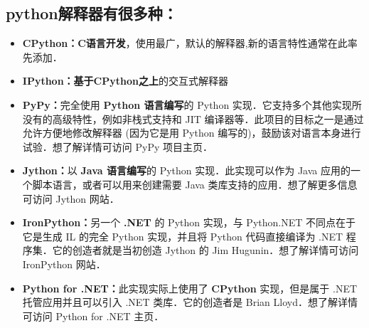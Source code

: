 \subsection{python解释器有很多种：}

\begin{itemize}
\item \textbf{CPython：}\textbf{C语言开发}，使用最广，默认的解释器,新的语言特性通常在此率先添加．

\item \textbf{IPython：}\textbf{基于CPython之上}的交互式解释器

\item \textbf{PyPy：}完全使用 \textbf{Python 语言编写}的 Python 实现．它支持多个其他实现所没有的高级特性，例如非栈式支持和 JIT 编译器等．此项目的目标之一是通过允许方便地修改解释器 (因为它是用 Python 编写的)，鼓励该对语言本身进行试验．想了解详情可访问 PyPy 项目主页．

\item \textbf{Jython：}以 \textbf{Java 语言编写}的 Python 实现．此实现可以作为 Java 应用的一个脚本语言，或者可以用来创建需要 Java 类库支持的应用．想了解更多信息可访问 Jython 网站．

\item \textbf{IronPython：}另一个 \textbf{.NET} 的 Python 实现，与 Python.NET 不同点在于它是生成 IL 的完全 Python 实现，并且将 Python 代码直接编译为 .NET 程序集．它的创造者就是当初创造 Jython 的 Jim Hugunin．想了解详情可访问 IronPython 网站．

\item \textbf{Python for .NET：}此实现实际上使用了 \textbf{CPython} 实现，但是属于 .NET 托管应用并且可以引入 .NET 类库．它的创造者是 Brian Lloyd．想了解详情可访问 Python for .NET 主页．
\end{itemize}

